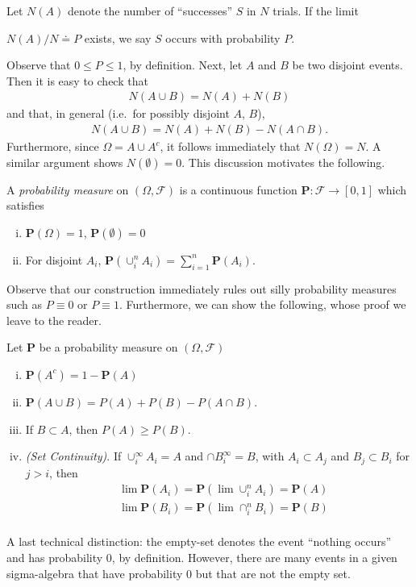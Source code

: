 \begin{definition}
	Let $N(A)$ denote the number of ``successes'' $S$ in $N$ trials. If the
	limit


	$N(A)/N \doteq P$ exists, we say $S$ occurs with probability $P$.
\end{definition}
Observe that $ 0 \le P \le 1$, by definition.
Next, let $A$ and $B$ be two disjoint events. Then
it is easy to check that
\begin{align*}
	N(A \cup B) = N(A) + N(B)
\end{align*}
and that, in general (i.e.\ for possibly disjoint $A$, $B$),
\begin{align*}
	N(A \cup B) = N(A) + N(B) - N(A \cap B).
\end{align*}
Furthermore, since $\Omega = A \cup A^c$, it follows immediately
that $N(\Omega) = N$. A similar argument shows $N(\emptyset) = 0$.
This discussion motivates the following.
\begin{definition}
	A \emph{probability measure} on $(\Omega, \mathcal{F})$ is a continuous function
	$\mathbf{P}: \mathcal{F} \to [0,1]$ which satisfies
	\begin{enumerate}[(i)]
		\item
			$\mathbf{P}(\Omega) = 1$, $\mathbf{P}(\emptyset) = 0$
		\item
			For disjoint $A_i$, $\mathbf{P}(\cup_i^n A_i) = \sum_{i = 1}^n 
			\mathbf{P}(A_i)$.
	\end{enumerate}
\end{definition}
Observe that our construction immediately rules out silly probability
measures such as $P \equiv 0$ or $P \equiv 1$. Furthermore,
we can show the following, whose proof we leave to the reader.
\begin{lemma}
	Let $\mathbf{P}$ be a probability measure on $(\Omega, \mathcal{F})$
	\begin{enumerate}[(i)]
		\item $\mathbf{P}(A^c) = 1 - \mathbf{P}(A)$
		\item $\mathbf{P}(A \cup B) = P(A) + P(B) - P(A \cap B)$.
		\item If $B \subset A$, then $P(A) \ge P(B)$.
		\item \emph{(Set Continuity)}.
			If $\cup_i^\infty A_i = A$ and
			$\cap B_i^\infty = B$, with $A_i \subset A_j$ and $B_j \subset B_i$ 
			for $j > i$,
			then
			\begin{align*}
				& \lim \mathbf{P}(A_i) = \mathbf{P}(\lim \cup_i^n A_i) = \mathbf{P}(A) \\
				& \lim \mathbf{P}(B_i) = \mathbf{P}(\lim \cap_i^n B_i) = \mathbf{P}(B) \\
			\end{align*}
	\end{enumerate}
\end{lemma}
A last technical distinction: the empty-set denotes the event ``nothing
occurs'' and has probability $0$, by definition. However, there are many
events in a given sigma-algebra that have probability $0$ but that are not the
empty set.

